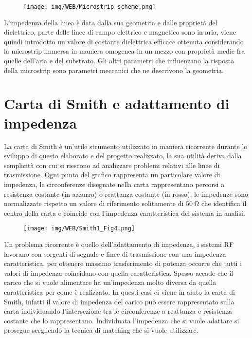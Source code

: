 \documentclass[12pt,oneside]{book}
\begin{document}
\begin{figure}[!htbp]
    \centering
        \texttt{[image: img/WEB/Microstrip\_scheme.png]}
    \caption{}
\end{figure}

L'impedenza della linea è data dalla sua geometria e dalle proprietà del dielettrico, parte delle linee di campo elettrico e magnetico sono in aria, viene quindi introdotto un valore di costante dielettrica efficace ottenuta considerando la microstrip immersa in maniera omogenea in un mezzo con proprietà medie fra quelle dell'aria e del substrato. Gli altri parametri che influenzano la risposta della microstrip sono parametri meccanici che ne descrivono la geometria.


\section{Carta di Smith e adattamento di impedenza}

La carta di Smith è un'utile strumento utilizzato in maniera ricorrente durante lo sviluppo di questo elaborato e del progetto realizzato, la sua utilità deriva dalla semplicità con cui si riescono ad analizzare problemi relativi alle linee di trasmissione.
Ogni punto del grafico rappresenta un particolare valore di impedenza, le circonferenze disegnate nella carta rappresentano percorsi a resistenza costante (in azzurro) o reattanza costante (in rosso), le impedenze sono normalizzate rispetto un valore di riferimento solitamente di $\SI{50}{\ohm}$ che identifica il centro della carta e coincide con l'impedenza caratteristica del sistema in analisi.

\begin{figure}[!htbp]
    \centering
        \texttt{[image: img/WEB/Smith1\_Fig4.png]}
        \caption{}
\end{figure}

Un problema ricorrente è quello dell'adattamento di impedenza, i sistemi RF lavorano con sorgenti di segnale e linee di trasmissione con una impedenza caratteristica, per ottenere massimo trasferimento di potenza occorre che tutti i valori di impedenza coincidano con quella caratteristica. Spesso accade che il carico che si vuole alimentare ha un'impedenza molto diversa da quella caratteristica per come è realizzato. In questi casi ci viene in aiuto la carta di Smith, infatti il valore di impedenza del carico può essere rappresentato sulla carta individuando l'intersezione tra le circonferenze a reattanza e resistenza costante che lo rappresentano. Individuata l'impedenza che si vuole adattare si prosegue scegliendo la tecnica di matching che si vuole utilizzare.
\end{document}
